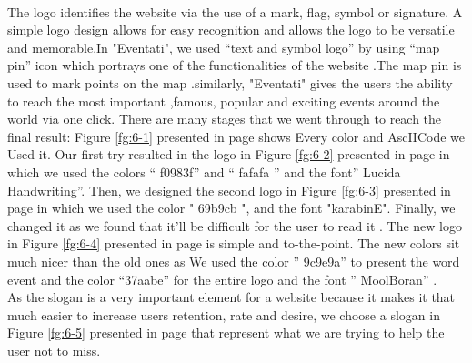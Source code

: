 \documentclass[12pt,a4paper,class,twoside,openany]{report}
\begin{document}
{\paragraph*{\hspace{.9 cm} } The logo identifies the website via the use of a mark, flag, symbol or signature. A simple logo design allows for easy recognition and allows the logo to be versatile and memorable.In "Eventati", we used “text and symbol logo” by using “map pin” icon which portrays one of the functionalities of the website .The map pin is used to mark points on the map .similarly, "Eventati" gives the users the ability to reach the most important ,famous, popular and exciting events around the world via one click.
There are many stages that we went through to reach the final result:
 Figure \ref{fg:6-1} presented in page \pageref{fg:6-1} shows Every color and AscIICode we Used it. 
Our first try resulted in the logo in Figure \ref{fg:6-2} presented in page \pageref{fg:6-2} in which we used the colors “  f0983f” and “ fafafa   ” and  the font” Lucida Handwriting”. Then, we designed the second logo in Figure \ref{fg:6-3} presented in page \pageref{fg:6-3} in which we used the color "  69b9cb ", and the font "karabinE". Finally, we changed it as we found that it’ll be difficult for the user to read it . The new logo in Figure \ref{fg:6-4} presented in page \pageref{fg:6-4} is simple and to-the-point. The new colors sit much nicer than the old ones as We used  the color ” 9c9e9a”  to present  the word event  and  the  color “37aabe”  for the entire logo and the font  ” MoolBoran” . 
\\
As the slogan is a very important element for a website because it makes it that much easier to increase users retention, rate and desire, we choose a slogan in Figure \ref{fg:6-5} presented in page \pageref{fg:6-5} that represent what we are trying to help the user not to miss.

}
\end{document}
